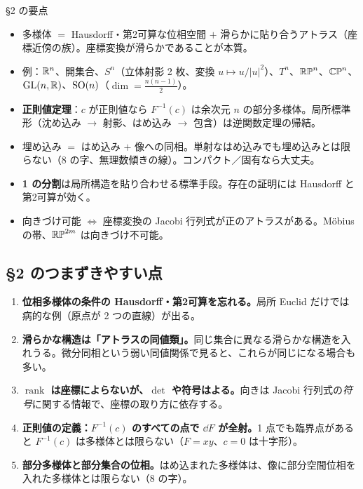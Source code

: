 \begin{keybox}{§2 の要点}
\begin{itemize}
\item 多様体 $=$ Hausdorff・第2可算な位相空間 $+$ 滑らかに貼り合うアトラス（座標近傍の族）。座標変換が滑らかであることが本質。
\item 例：$\mathbb R^n$、開集合、$S^n$（立体射影 2 枚、変換 \mbox{$u\mapsto u/|u|^2$}）、\allowbreak $T^n$、\allowbreak $\mathbb{RP}^n$、\allowbreak $\mathbb{CP}^n$、\allowbreak $\mathrm{GL}(n,\mathbb R)$、\allowbreak $\mathrm{SO}(n)$（$\dim=\frac{n(n-1)}{2}$）。
\item \textbf{正則値定理}：$c$ が正則値なら $F^{-1}(c)$ は余次元 $n$ の部分多様体。局所標準形（沈め込み $\to$ 射影、はめ込み $\to$ 包含）は逆関数定理の帰結。
\item 埋め込み $=$ はめ込み $+$ 像への同相。単射なはめ込みでも埋め込みとは限らない（8 の字、無理数傾きの線）。コンパクト／固有なら大丈夫。
\item \textbf{1 の分割}は局所構造を貼り合わせる標準手段。存在の証明には Hausdorff と第2可算が効く。
\item 向きづけ可能 $\Leftrightarrow$ 座標変換の Jacobi 行列式が正のアトラスがある。Möbius の帯、$\mathbb{RP}^{2m}$ は向きづけ不可能。
\end{itemize}
\end{keybox}

\subsection*{§2 のつまずきやすい点}
\begin{enumerate}
\item \textbf{位相多様体の条件の Hausdorff・第2可算を忘れる。}局所 Euclid だけでは病的な例（原点が 2 つの直線）が出る。
\item \textbf{滑らかな構造は「アトラスの同値類」。}同じ集合に異なる滑らかな構造を入れうる。微分同相という弱い同値関係で見ると、これらが同じになる場合も多い。
\item \textbf{$\operatorname{rank}$ は座標によらないが、$\det$ や符号はよる。}向きは Jacobi 行列式の\emph{符号}に関する情報で、座標の取り方に依存する。
\item \textbf{正則値の定義：$F^{-1}(c)$ のすべての点で $\dd F$ が全射。}1 点でも臨界点があると $F^{-1}(c)$ は多様体とは限らない（$F=xy$、$c=0$ は十字形）。
\item \textbf{部分多様体と部分集合の位相。}はめ込まれた多様体は、像に部分空間位相を入れた多様体とは限らない（8 の字）。
\end{enumerate}

